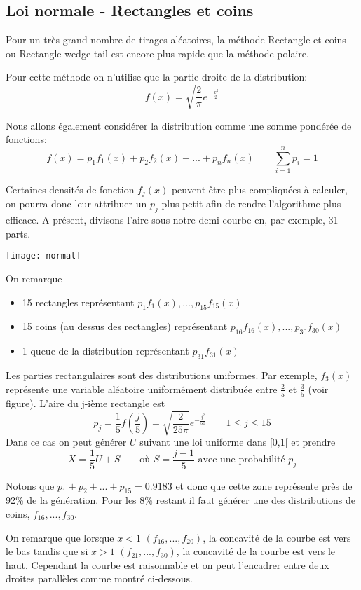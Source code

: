 \subsection{Loi normale - Rectangles et coins}
Pour un très grand nombre de tirages aléatoires, la méthode Rectangle et coins ou \linebreak Rectangle-wedge-tail est encore plus rapide que la méthode polaire.

Pour cette méthode on n'utilise que la partie droite de la distribution:
\[f(x)=\sqrt{\frac{2}{\pi}}e^{-\frac{x^2}{2}}\]

Nous allons également considérer la distribution comme une somme pondérée de fonctions:
\[f(x)=p_1f_1(x)+p_2f_2(x)+...+p_nf_n(x) \qquad \sum\limits_{i=1}^{n} p_i=1\]

Certaines densités de fonction $f_j(x)$ peuvent être plus compliquées à calculer, on pourra donc leur attribuer un $p_j$ plus petit afin de rendre l'algorithme plus efficace.
A présent, divisons l'aire sous notre demi-courbe en, par exemple, 31 parts.

\begin{center}
\texttt{[image: normal]}
\end{center}

On remarque
\begin{itemize}
\item 15 rectangles représentant $p_1f_1(x),...,p_{15}f_{15}(x)$
\item 15 coins (au dessus des rectangles) représentant $p_{16}f_{16}(x),...,p_{30}f_{30}(x)$
\item 1 queue de la distribution représentant $p_{31}f_{31}(x)$
\end{itemize}

Les parties rectangulaires sont des distributions uniformes. Par exemple, $f_3(x)$ représente une variable aléatoire uniformément distribuée entre $\frac{2}{5}$ et $\frac{3}{5}$ (voir figure). L'aire du j-ième rectangle est
\[p_j=\frac{1}{5}f(\frac{j}{5})=\sqrt{\frac{2}{25\pi}}e^{-\frac{j^2}{50}} \qquad 1\leq j\leq 15\]
Dans ce cas on peut générer $U$ suivant une loi uniforme dans [0,1[ et prendre \[X=\frac{1}{5}U+S\qquad \text{où }S=\frac{j-1}{5}\text{ avec une probabilité }p_j\]

Notons que $p_1+p_2+...+p_{15}=0.9183$ et donc que cette zone représente près de 92\% de la génération. Pour les 8\% restant il faut générer une des distributions de \og coins\fg{}, $f_{16},...,f_{30}$.

On remarque que lorsque $x<1$ $(f_{16},...,f_{20})$, la concavité de la courbe est vers le bas tandis que si $x>1$ $(f_{21},...,f_{30})$, la concavité de la courbe est vers le haut.
Cependant la courbe est raisonnable et on peut l'encadrer entre deux droites parallèles comme montré ci-dessous.

